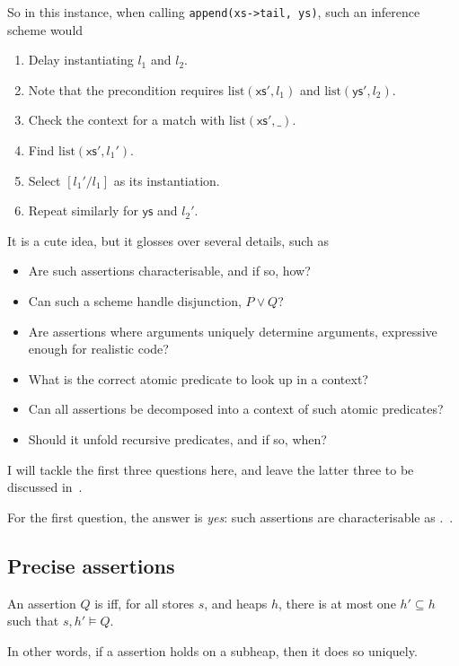 So in this instance, when calling \texttt{append(xs->tail, ys)}, %
such an inference scheme would
\begin{enumerate}
    \item Delay instantiating $l_1$ and $l_2$.
    \item Note that the precondition requires $\mathrm{list}(\mathsf{xs}',
        l_1)$ and $\mathrm{list}(\mathsf{ys}', l_2)$.
    \item Check the context for a match with $\mathrm{list}(\mathsf{xs}',
        \_)$.
    \item Find $\mathrm{list}(\mathsf{xs}', l_1')$.
    \item Select $[l_1' / l_1]$ as its instantiation.
    \item Repeat similarly for $\mathsf{ys}$ and $l_2'$.
\end{enumerate}

It is a cute idea, but it glosses over several details, such as
\begin{itemize}
    \item Are such assertions characterisable, and if so, how?
    \item Can such a scheme handle disjunction, $ P \vee{} Q$?
    \item Are assertions where  arguments uniquely determine
         arguments, expressive enough for realistic code?
    \item What is the correct atomic predicate to look up in a context?
    \item Can all assertions be decomposed into a context of such atomic
        predicates?
    \item Should it unfold recursive predicates, and if so, when?
\end{itemize}

I will tackle the first three questions here, and leave the latter three
to be discussed in~.

For the first question, the answer is \emph{yes}: such assertions are
characterisable as .~.

\subsection{Precise assertions}\label{subsec:precise-assertion}

\begin{definition}%
\label{def:precise-assertion}
    \AP{} An assertion $Q$ is  iff, for all stores $s$, and heaps
    $h$, there is at most one $h' \subseteq{} h$ such that $s , h' \vDash{} Q$.

    In other words, if a  assertion holds on a subheap, then it
    does so uniquely.
\end{definition}

